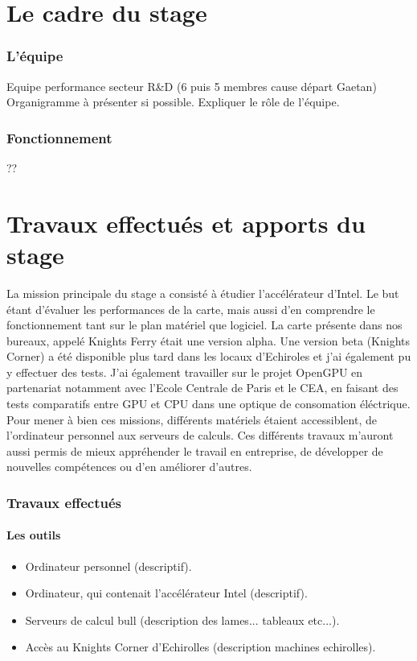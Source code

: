\documentclass{article}
\begin{document}
\newpage
{}
\part{Le cadre du stage}
	\section{L'équipe}
	Equipe performance secteur R\&D (6 puis 5 membres cause départ Gaetan) \newline
	Organigramme à présenter si possible. \newline
	Expliquer le rôle de l'équipe.
	\section{Fonctionnement}
	??

\newpage
{}
\part{Travaux effectués et apports du stage}
La mission principale du stage a consisté à étudier l'accélérateur d'Intel. Le but étant d'évaluer les performances de la carte,
mais aussi d'en comprendre le fonctionnement tant sur le plan matériel que logiciel. La carte présente dans nos bureaux,
appelé Knights Ferry était une version alpha. Une version beta (Knights Corner) a été disponible plus tard dans les locaux
d'Echiroles et j'ai également pu y effectuer des tests. \newline
J'ai également travailler sur le projet OpenGPU en partenariat notamment avec l'Ecole Centrale de Paris et le CEA,
en faisant des tests comparatifs entre GPU et CPU dans une optique de consomation éléctrique. \newline
Pour mener à bien ces missions, différents matériels étaient accessiblent, de l'ordinateur personnel aux serveurs de calculs.
Ces différents travaux m'auront aussi permis de mieux appréhender le travail en entreprise, de développer de nouvelles compétences 
ou d'en améliorer d'autres.
	\section{Travaux effectués}
		\subsection{Les outils}
		\begin{itemize}
		\item Ordinateur personnel (descriptif).
		\item Ordinateur, qui contenait l'accélérateur Intel (descriptif).
		\item Serveurs de calcul bull (description des lames... tableaux etc...).
		\item Accès au Knights Corner d'Echirolles (description machines echirolles).
		\end{itemize}
\end{document}
